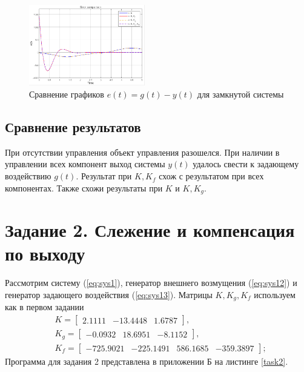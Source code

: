 \documentclass[a4paper, 12pt]{article}
\begin{document}
    \begin{figure}[H]
        \centering
        \includegraphics[width=0.45\textwidth]{1task_e.png}
        \caption{Сравнение графиков $e(t)=g(t)-y(t)$ для замкнутой системы}
        \label{fig:1task_e}
    \end{figure}


    \subsection{Сравнение результатов}
    При отсутствии управления объект управления разошелся.
    При наличии в управлении всех компонент выход системы $y(t)$
    удалось свести к задающему воздействию $g(t)$. Результат
    при $K,K_f$ схож с результатом при всех компонентах.
    Также схожи результаты при $K$ и $K,K_g$.


    \section{Задание 2. Слежение и компенсация по выходу}
    Рассмотрим систему (\ref{eq:sys1}),
    генератор внешнего возмущения (\ref{eq:sys12}) и
    генератор задающего воздействия (\ref{eq:sys13}).
    Матрицы $K,K_g,K_f$ используем как в первом задании
    \begin{align*}
    &K=\begin{bmatrix}
        2.1111  &-13.4448    &1.6787
    \end{bmatrix},\\
    &K_g=
    \begin{bmatrix}
        -0.0932   &18.6951   &-8.1152
    \end{bmatrix},\\
    &K_f=\begin{bmatrix}
        -725.9021 &-225.1491  &586.1685 &-359.3897
    \end{bmatrix};
    \end{align*}
    Программа для задания 2 представлена в приложении Б на листинге \ref{task2}.
\end{document}

